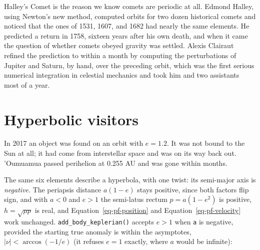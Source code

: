 \documentclass[
  10.5pt,
  letterpaper,
]{scrbook}
\theoremstyle{definition}
\theoremstyle{plain}
\theoremstyle{remark}
\begin{document}
\begin{tcolorbox}[enhanced jigsaw, arc=.35mm, bottomrule=.15mm, bottomtitle=1mm, breakable, colback=white, colbacktitle=quarto-callout-note-color!10!white, colframe=quarto-callout-note-color-frame, coltitle=black, left=2mm, leftrule=.75mm, opacityback=0, opacitybacktitle=0.6, rightrule=.15mm, title={Where it comes from}, titlerule=0mm, toprule=.15mm, toptitle=1mm]

Halley's Comet is the reason we know comets are periodic at all. Edmond
Halley, using Newton's new method, computed orbits for two dozen
historical comets and noticed that the ones of 1531, 1607, and 1682 had
nearly the same elements. He predicted a return in 1758, sixteen years
after his own death, and when it came the question of whether comets
obeyed gravity was settled. Alexis Clairaut refined the prediction to
within a month by computing the perturbations of Jupiter and Saturn, by
hand, over the preceding orbit, which was the first serious numerical
integration in celestial mechanics and took him and two assistants most
of a year.

\end{tcolorbox}

\section{Hyperbolic visitors}\label{hyperbolic-visitors}

In 2017 an object was found on an orbit with \(e = 1.2\). It was not
bound to the Sun at all; it had come from interstellar space and was on
its way back out. 'Oumuamua passed perihelion at 0.255 AU and was gone
within months.

The same six elements describe a hyperbola, with one twist: its
semi-major axis is \emph{negative}. The periapsis distance \(a(1-e)\)
stays positive, since both factors flip sign, and with \(a < 0\) and
\(e > 1\) the semi-latus rectum \(p = a(1-e^2)\) is positive,
\(h = \sqrt{\mu p}\) is real, and Equation~\ref{eq-pf-position} and
Equation~\ref{eq-pf-velocity} work unchanged.
\texttt{add\_body\_keplerian()} accepts \(e > 1\) when \texttt{a} is
negative, provided the starting true anomaly is within the asymptotes,
\(|\nu| < \arccos(-1/e)\) (it refuses \(e = 1\) exactly, where \(a\)
would be infinite):
\end{document}
